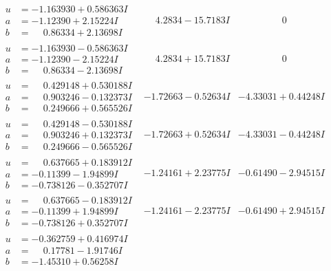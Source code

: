 \documentclass[1p]{elsarticle_modified}
\theoremstyle{definition}
\begin{document}
$$\begin{array}{c|c|c}
\begin{aligned}
u &= -1.163930 + 0.586363 I \\
a &= -1.12390 + 2.15224 I \\
b &= \phantom{-}0.86334 + 2.13698 I\end{aligned}
 & \phantom{-}4.2834 - 15.7183 I & \phantom{-0.000000 } 0 \\ \hline\begin{aligned}
u &= -1.163930 - 0.586363 I \\
a &= -1.12390 - 2.15224 I \\
b &= \phantom{-}0.86334 - 2.13698 I\end{aligned}
 & \phantom{-}4.2834 + 15.7183 I & \phantom{-0.000000 } 0 \\ \hline\begin{aligned}
u &= \phantom{-}0.429148 + 0.530188 I \\
a &= \phantom{-}0.903246 - 0.132373 I \\
b &= \phantom{-}0.249666 + 0.565526 I\end{aligned}
 & -1.72663 - 0.52634 I & -4.33031 + 0.44248 I \\ \hline\begin{aligned}
u &= \phantom{-}0.429148 - 0.530188 I \\
a &= \phantom{-}0.903246 + 0.132373 I \\
b &= \phantom{-}0.249666 - 0.565526 I\end{aligned}
 & -1.72663 + 0.52634 I & -4.33031 - 0.44248 I \\ \hline\begin{aligned}
u &= \phantom{-}0.637665 + 0.183912 I \\
a &= -0.11399 - 1.94899 I \\
b &= -0.738126 - 0.352707 I\end{aligned}
 & -1.24161 + 2.23775 I & -0.61490 - 2.94515 I \\ \hline\begin{aligned}
u &= \phantom{-}0.637665 - 0.183912 I \\
a &= -0.11399 + 1.94899 I \\
b &= -0.738126 + 0.352707 I\end{aligned}
 & -1.24161 - 2.23775 I & -0.61490 + 2.94515 I \\ \hline\begin{aligned}
u &= -0.362759 + 0.416974 I \\
a &= \phantom{-}0.17781 - 1.91746 I \\
b &= -1.45310 + 0.56258 I\end{aligned}

\end{array}$$
\end{document}
